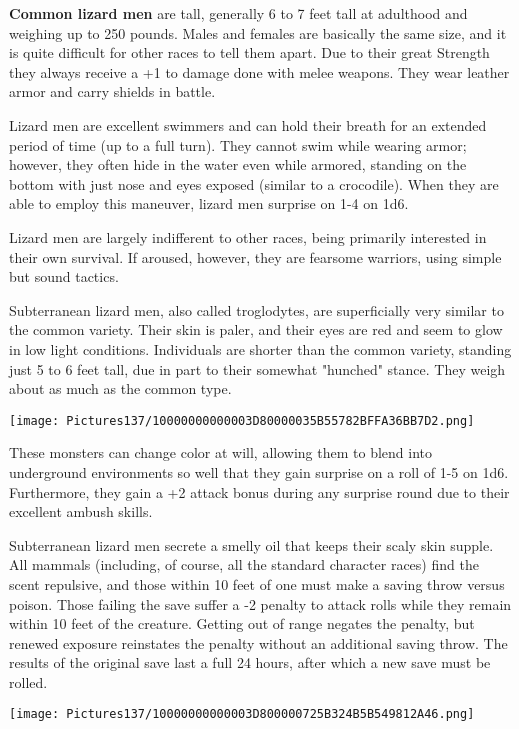 \documentclass[a4paper,twoside,openany,10pt]{book}
\begin{document}
\begin{multicols}{2}
\textbf{Common lizard men }are tall, generally 6 to 7 feet tall at adulthood and weighing up to 250 pounds. Males and females are basically the same size, and it is quite difficult for other races to tell them apart. Due to their great Strength they always receive a +1 to damage done with melee weapons. They wear leather armor and carry shields in battle.

Lizard men are excellent swimmers and can hold their breath for an extended period of time (up to a full turn). They cannot swim while wearing armor; however, they often hide in the water even while armored, standing on the bottom with just nose and eyes exposed (similar to a crocodile). When they are able to employ this maneuver, lizard men surprise on 1-4 on 1d6.

Lizard men are largely indifferent to other races, being primarily interested in their own survival. If aroused, however, they are fearsome warriors, using simple but sound tactics. 

Subterranean lizard men, also called troglodytes, are superficially very similar to the common variety. Their skin is paler, and their eyes are red and seem to glow in low light conditions. Individuals are shorter than the common variety, standing just 5 to 6 feet tall, due in part to their somewhat "hunched" stance. They weigh about as much as the common type.


\begin{center} \texttt{[image: Pictures137/10000000000003D80000035B55782BFFA36BB7D2.png]} \end{center}


These monsters can change color at will, allowing them to blend into underground environments so well that they gain surprise on a roll of 1-5 on 1d6. Furthermore, they gain a +2 attack bonus during any surprise round due to their excellent ambush skills.

Subterranean lizard men secrete a smelly oil that keeps their scaly skin supple. All mammals (including, of course, all the standard character races) find the scent repulsive, and those within 10 feet of one must make a saving throw versus poison. Those failing the save suffer a -2 penalty to attack rolls while they remain within 10 feet of the creature. Getting out of range negates the penalty, but renewed exposure reinstates the penalty without an additional saving throw. The results of the original save last a full 24 hours, after which a new save must be rolled.

\begin{center} \texttt{[image: Pictures137/10000000000003D800000725B324B5B549812A46.png]} \end{center}



\end{multicols}
\end{document}
